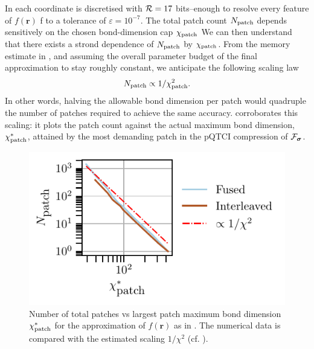 In  each coordinate is discretised with $\mathcal{R} = 17$ bits--enough to resolve every feature of $f(\boldsymbol{r})$
f to a tolerance of $\varepsilon=10^{-7}$.
The total patch count $N_{\text{patch}}$ depends sensitively on the chosen bond-dimension cap $\chi_{\text{patch}}$
We can then understand that there exists a strond dependence of $N_{\text{patch}}$ by $\chi_{\text{patch}}$. From the memory estimate in , and assuming the overall parameter budget of the final approximation to stay roughly constant, we anticipate the following scaling law
\begin{equation}
	N_{\text{patch}} \propto 1 / \chi_{\text{patch}}^2. 
	\label{eq:scalingNpatchBonddim}
\end{equation}
In other words, halving the allowable bond dimension per patch would quadruple the number of patches required to achieve the same accuracy.
 corroborates this scaling: it plots the patch count against the actual maximum bond dimension, $\chi_{\text{patch}}^*$\footnotemark, attained by the most demanding patch in the pQTCI compression of $\mathcal{F}_{\boldsymbol{\sigma}}$.
\begin{figure}[htbp]
	\centering
	\includegraphics{figures/localFunc_Npatch_vs_Chipatch.pdf}
	\caption{Number of total patches vs largest patch maximum bond dimension $\chi_{\text{patch}}^*$ for the approximation of $f(\boldsymbol{r})$ as in . The numerical data is compared with the estimated scaling $1/\chi^2$ (cf. ).}
	\label{fig:NpatchvsChipatch}
\end{figure}

